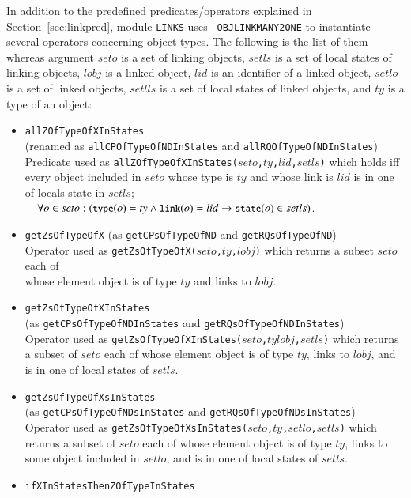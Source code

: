 \documentclass[12pt]{report}
\newcommand{\ra}{\rightarrow}
\newcommand{\mbstt}[1]{\mbox{\small{\tt {#1}}}}
\newcommand{\stt}[1]{{\small{\tt {#1}}}}
\begin{document}
In addition to the predefined predicates/operators explained in
Section~\ref{sec:linkpred}, module {\tt LINKS} uses {\tt
  OBJLINKMANY2ONE} to instantiate several operators concerning object
types. The following is the list of them whereas argument $seto$ is a
set of linking objects, $setls$ is a set of local states of linking
objects, $\mathit{lobj}$ is a linked object, $lid$ is an identifier of a linked
object, $setlo$ is a set of linked objects, $setlls$ is a set of local
states of linked objects, and $ty$ is a type of an object:
\begin{itemize}
\item \stt{allZOfTypeOfXInStates}\\
  (renamed as \stt{allCPOfTypeOfNDInStates} and \stt{allRQOfTypeOfNDInStates})\\
  Predicate used as
  \stt{allZOfTypeOfXInStates($seto$,$ty$,$lid$,$setls$)} which holds
  iff every object included in $seto$ whose type is $ty$ and whose
  link is $lid$ is in one of locals state in $setls$;\\$~~~~\forall
  o\in
  seto:(\mbstt{type}(o)=ty\land\mbstt{link}(o)=lid\ra\mbstt{state}(o)\in
  setls)$.
\item \stt{getZsOfTypeOfX} (as \stt{getCPsOfTypeOfND} and \stt{getRQsOfTypeOfND})\\
  Operator used as \stt{getZsOfTypeOfX($seto$,$ty$,$\mathit{lobj}$)} which
  returns a subset $seto$ each of\\ whose element object is of type $ty$
  and links to $\mathit{lobj}$.
\item \stt{getZsOfTypeOfXInStates}\\
  (as \stt{getCPsOfTypeOfNDInStates} and \stt{getRQsOfTypeOfNDInStates})\\
  Operator used as
  \stt{getZsOfTypeOfXInStates($seto$,$ty$$\mathit{lobj}$,$setls$)} which
  returns a subset of $seto$ each of whose element object is of type
  $ty$, links to $\mathit{lobj}$, and is in one of local states of $setls$.
\item \stt{getZsOfTypeOfXsInStates}\\
  (as \stt{getCPsOfTypeOfNDsInStates} and \stt{getRQsOfTypeOfNDsInStates})\\
  Operator used as
  \stt{getZsOfTypeOfXsInStates($seto$,$ty$,$setlo$,$setls$)} which
  returns a subset of $seto$ each of whose element object is of type
  $ty$, links to some object included in $setlo$, and is in one of
  local states of $setls$.
\item \stt{ifXInStatesThenZOfTypeInStates}\\

\end{itemize}
\end{document}
